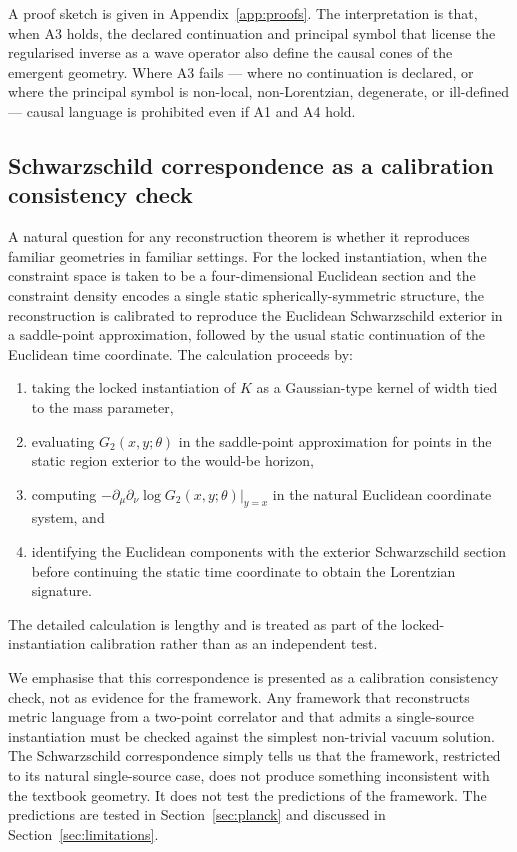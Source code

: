 ﻿\documentclass[12pt,a4paper]{article}
\theoremstyle{definition}
\begin{document}
A proof sketch is given in Appendix~\ref{app:proofs}. The interpretation is that, when A3 holds, the declared continuation and principal symbol that license the regularised inverse as a wave operator also define the causal cones of the emergent geometry. Where A3 fails --- where no continuation is declared, or where the principal symbol is non-local, non-Lorentzian, degenerate, or ill-defined --- causal language is prohibited even if A1 and A4 hold.

\subsection{Schwarzschild correspondence as a calibration consistency check}
\label{sec:schwarzschild}

A natural question for any reconstruction theorem is whether it reproduces familiar geometries in familiar settings. For the locked instantiation, when the constraint space is taken to be a four-dimensional Euclidean section and the constraint density encodes a single static spherically-symmetric structure, the reconstruction is calibrated to reproduce the Euclidean Schwarzschild exterior in a saddle-point approximation, followed by the usual static continuation of the Euclidean time coordinate. The calculation proceeds by:
\begin{enumerate}
  \item taking the locked instantiation of $K$ as a Gaussian-type kernel of width tied to the mass parameter,
  \item evaluating $G_2(x,y;\theta)$ in the saddle-point approximation for points in the static region exterior to the would-be horizon,
  \item computing $-\partial_\mu\partial_\nu \log G_2(x,y;\theta)|_{y=x}$ in the natural Euclidean coordinate system, and
  \item identifying the Euclidean components with the exterior Schwarzschild section before continuing the static time coordinate to obtain the Lorentzian signature.
\end{enumerate}
The detailed calculation is lengthy and is treated as part of the locked-instantiation calibration rather than as an independent test.

We emphasise that this correspondence is presented as a calibration consistency check, not as evidence for the framework. Any framework that reconstructs metric language from a two-point correlator and that admits a single-source instantiation must be checked against the simplest non-trivial vacuum solution. The Schwarzschild correspondence simply tells us that the framework, restricted to its natural single-source case, does not produce something inconsistent with the textbook geometry. It does not test the predictions of the framework. The predictions are tested in Section~\ref{sec:planck} and discussed in Section~\ref{sec:limitations}.
\end{document}
